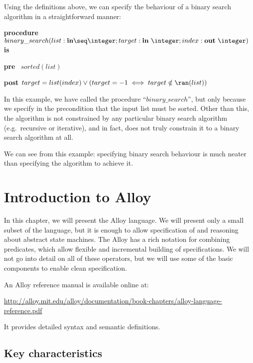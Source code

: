 \begin{example}
Using the definitions above, we can specify the behaviour of a binary search algorithm in a straightforward manner:

\textbf{procedure}  $binary\_search (list : \textbf{in} \seq \integer; target : \textbf{in}\ \integer; index : \textbf{out}\ \integer)$ \textbf{is}

\vspace{-2mm}

\quad \textbf{pre} ~$sorted(list)$

\vspace{-2mm}

\quad \textbf{post} $target = list(index) \lor (target = -1 \iff target \notin \ran(list))$

In this example, we have called the procedure ``$binary\_search$'', but only because we specify in the precondition that the input list must be sorted. Other than this, the algorithm is not constrained by any particular binary search algorithm (e.g.\ recursive or iterative), and in fact, does not truly constrain it to a binary search algorithm at all.

We can see from this example: specifying binary search behaviour is much neater than specifying the algorithm to achieve it.

\end{example}

\section{Introduction to Alloy}

In this chapter, we will present the Alloy language. We will present only a small subset of the language, but it is enough to allow specification of and reasoning about  abstract state machines. The Alloy has a rich notation for combining predicates, which allow flexible and incremental building of specifications. We will not go into detail on all of these operators, but we will use some of the basic components to enable clean specification.

An Alloy reference manual is available online at:

 \url{http://alloy.mit.edu/alloy/documentation/book-chapters/alloy-language-reference.pdf}

It provides detailed syntax and semantic definitions. 


\subsection{Key characteristics}

